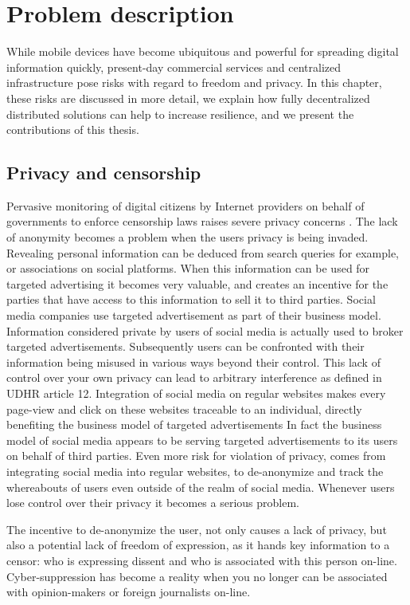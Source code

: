 \chapter{Problem description}\label{ch:problem_desc}
While mobile devices have become ubiquitous and powerful for spreading digital information quickly, present-day commercial services and centralized infrastructure pose risks with regard to freedom and privacy.
In this chapter, these risks are discussed in more detail, we explain how fully decentralized distributed solutions can help to increase resilience, and we present the contributions of this thesis.

\section{Privacy and censorship}
Pervasive monitoring of digital citizens by Internet providers on behalf of governments to enforce censorship laws raises severe privacy concerns \cite{nsa_privacy}.
The lack of anonymity becomes a problem when the users privacy is being invaded.
Revealing personal information can be deduced from search queries for example, or associations on social platforms.
When this information can be used for targeted advertising it becomes very valuable, and creates an incentive for the parties that have access to this information to sell it to third parties.
Social media companies use targeted advertisement as part of their business model.
Information considered private by users of social media is actually used to broker targeted advertisements.
Subsequently users can be confronted with their information being misused in various ways beyond their control.
This lack of control over your own privacy can lead to arbitrary interference as defined in UDHR article 12. %
Integration of social media on regular websites makes every page-view and click on these websites traceable to an individual, directly benefiting the business model of targeted advertisements
In fact the business model of social media appears to be serving targeted advertisements to its users on behalf of third parties.
Even more risk for violation of privacy, comes from integrating social media into regular websites, to de-anonymize and track the whereabouts of users even outside of the realm of social media.
Whenever users lose control over their privacy it becomes a serious problem.

The incentive to de-anonymize the user, not only causes a lack of privacy, but also a potential lack of freedom of expression, as it hands key information to a censor: who is expressing dissent and who is associated with this person on-line.
Cyber-suppression has become a reality when you no longer can be associated with opinion-makers or foreign journalists on-line.

